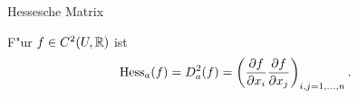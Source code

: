 \documentclass[class=article, crop=false]{standalone}
\begin{document}
\begin{zettel}{Hessesche Matrix}
\begin{flashcard}{}

	\begin{definition}
		F"ur $f \in  C^2 (U,\mathbb{R}  )$ ist
		\[
			\operatorname{Hess}_a(f) = D_a^2(f) = \left(\frac{\partial f}{\partial x_i} \frac{\partial f}{\partial x_j}\right)_{i,j = 1, \dots , n }
		.\]
	\end{definition}
\end{flashcard}
\end{zettel}
\end{document}
